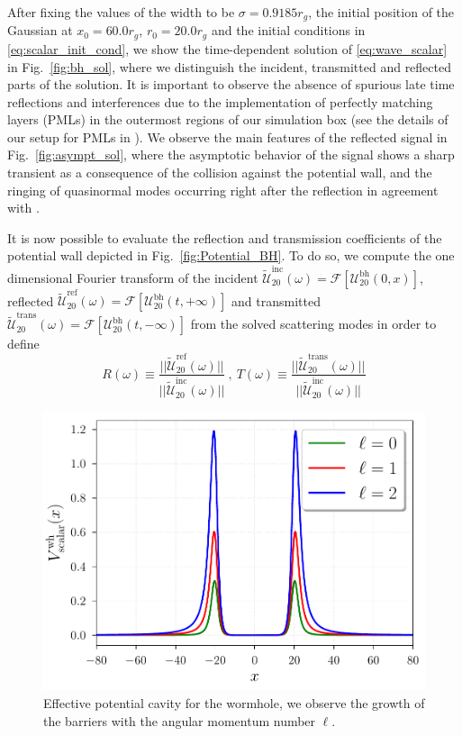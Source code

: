 \documentclass[article,aps,nofootinbib,twocolumn,superscriptaddress]{revtex4-1}
\begin{document}
After fixing the values of the width to be $\sigma=0.9185r_g$, the initial position of the Gaussian at $x_0=60.0r_g$, $r_0=20.0r_g$ and the initial conditions in \eqref{eq:scalar_init_cond}, we show the time-dependent solution of \eqref{eq:wave_scalar} in Fig.~\ref{fig:bh_sol}, where we distinguish the incident, transmitted and reflected parts of the solution. It is important to observe the absence of spurious late time reflections and interferences due to the implementation of perfectly matching layers (PMLs) in the outermost regions of our simulation box (see the details of our setup for PMLs in \citep{Frolov:2017asg}). We observe the main features of the reflected signal in Fig.~\ref{fig:asympt_sol}, where the asymptotic behavior of the signal shows a sharp transient as a consequence of the collision against the potential wall, and the ringing of quasinormal modes occurring right after the reflection in agreement with \citep{Petrich:1985csm}. 

It is now possible to evaluate the reflection and transmission coefficients of the potential wall depicted in Fig.~\ref{fig:Potential_BH}. To do so, we compute the one dimensional Fourier transform of the incident $\tilde{\mathcal{U}}_{20}^{\mathrm{inc}}(\omega)=\mathcal{F}[\mathcal{U}^{\mathrm{bh}}_{20}(0,x)]$, reflected $\tilde{\mathcal{U}}_{20}^{\mathrm{ref}}(\omega)=\mathcal{F}[\mathcal{U}^{\mathrm{bh}}_{20}(t,+\infty)]$ and transmitted $\tilde{\mathcal{U}}_{20}^{\mathrm{trans}}(\omega)=\mathcal{F}[\mathcal{U}^{\mathrm{bh}}_{20}(t,-\infty)]$ from the solved scattering modes in order to define
\begin{equation}
R(\omega)\equiv \frac{||\tilde{\mathcal{U}}_{20}^{\mathrm{ref}}(\omega)||}{||\tilde{\mathcal{U}}_{20}^{\mathrm{inc}}(\omega)||}~,~T(\omega)\equiv \frac{||\tilde{\mathcal{U}}_{20}^{\mathrm{trans}}(\omega)||}{||\tilde{\mathcal{U}}_{20}^{\mathrm{inc}}(\omega)||}
\label{eq:ref_and_trans}
\end{equation}
\begin{figure}[t]
\centering
\includegraphics[width=.4\textwidth]{figures/potential_scalar.pdf}
\caption{\label{fig:potential_wh} Effective potential cavity for the wormhole, we observe the growth of the barriers with the angular momentum number $\ell$.}
\end{figure}
\end{document}
